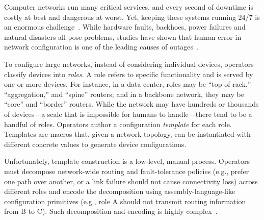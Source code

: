 \documentclass[numbers, 10pt, preprint]{sigplanconf}
\begin{document}


Computer networks run many critical services, and every second of downtime is
costly at best and dangerous at worst.  Yet, keeping these systems
running 24/7 is an enormous
challenge~\cite{mahajan+:bgp-misconfiguration,feamster+:rcc,batfish,dc-failure-study}.
%
While hardware faults, backhoes, power failures and natural disasters all pose
problems, studies have shown that human error in network
configuration is one of the leading causes of
outages~\cite{juniper-study,yankee-study}.

To configure large networks, instead of considering individual
devices, operators classify devices into {\em roles}. A role refers to
specific functionality and is served by one or more devices. For instance, in a
data center, roles may be ``top-of-rack,'' ``aggregation,'' and ``spine''
routers; and in a backbone network, they may be ``core'' and ``border''
routers. While the network may have hundreds or thousands of devices---a scale
that is impossible for humans to handle---there tend to be a handful of roles.
%
Operators author a configuration {\em template} for each role. Templates are
macros that, given a network topology, can be instantiated with different concrete values to generate device configurations.

Unfortunately, template construction is a low-level, manual process. Operators
must decompose network-wide routing and fault-tolerance policies (e.g.,
prefer one path over another, or a link failure should not cause connectivity loss) across different roles and encode the decomposition using assembly-language-like
configuration primitives (e.g., role A should not transmit routing information
from B to C). Such decomposition and encoding is highly complex~\cite{propane}.
\end{document}
